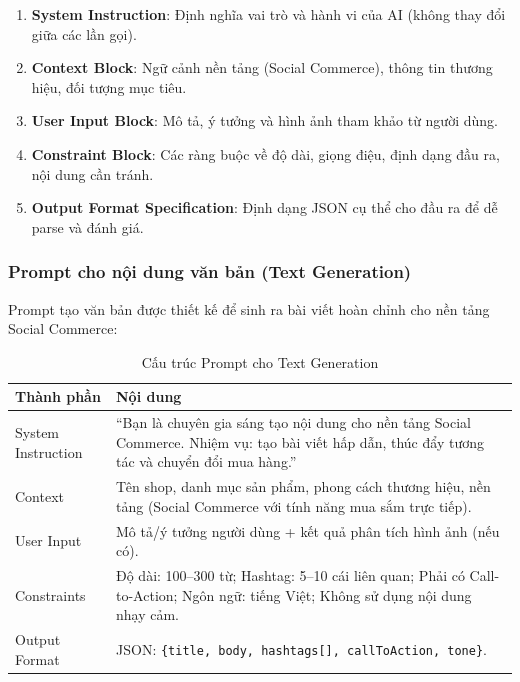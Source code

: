 \begin{enumerate}
    \item \textbf{System Instruction}: Định nghĩa vai trò và hành vi của AI (không thay đổi giữa các lần gọi).
    \item \textbf{Context Block}: Ngữ cảnh nền tảng (Social Commerce), thông tin thương hiệu, đối tượng mục tiêu.
    \item \textbf{User Input Block}: Mô tả, ý tưởng và hình ảnh tham khảo từ người dùng.
    \item \textbf{Constraint Block}: Các ràng buộc về độ dài, giọng điệu, định dạng đầu ra, nội dung cần tránh.
    \item \textbf{Output Format Specification}: Định dạng JSON cụ thể cho đầu ra để dễ parse và đánh giá.
\end{enumerate}

\subsubsection{Prompt cho nội dung văn bản (Text Generation)}

Prompt tạo văn bản được thiết kế để sinh ra bài viết hoàn chỉnh cho nền tảng Social Commerce:

\begin{table}[H]
\centering
\renewcommand{\arraystretch}{1.3}
\begin{tabularx}{\textwidth}{|l|X|}
\hline
\textbf{Thành phần} & \textbf{Nội dung} \\ \hline
System Instruction & ``Bạn là chuyên gia sáng tạo nội dung cho nền tảng Social Commerce. Nhiệm vụ: tạo bài viết hấp dẫn, thúc đẩy tương tác và chuyển đổi mua hàng.'' \\ \hline
Context & Tên shop, danh mục sản phẩm, phong cách thương hiệu, nền tảng (Social Commerce với tính năng mua sắm trực tiếp). \\ \hline
User Input & Mô tả/ý tưởng người dùng + kết quả phân tích hình ảnh (nếu có). \\ \hline
Constraints & Độ dài: 100--300 từ; Hashtag: 5--10 cái liên quan; Phải có Call-to-Action; Ngôn ngữ: tiếng Việt; Không sử dụng nội dung nhạy cảm. \\ \hline
Output Format & JSON: \texttt{\{title, body, hashtags[], callToAction, tone\}}. \\ \hline
\end{tabularx}
\caption{Cấu trúc Prompt cho Text Generation}
\label{tab:prompt-text}
\end{table}

